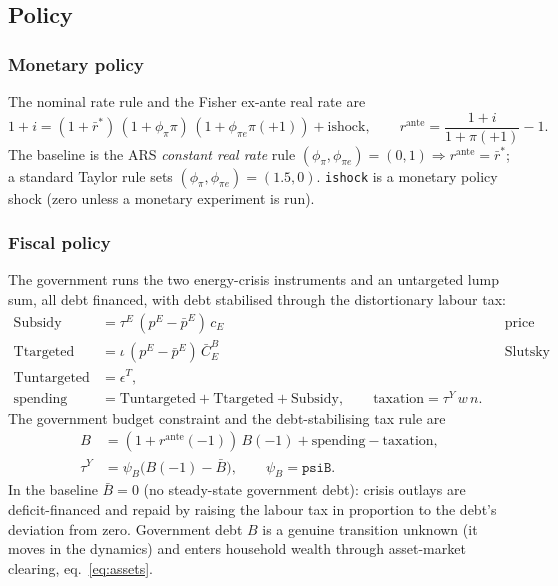 \documentclass[11pt,a4paper]{article}
\newcommand{\pE}{p^{E}}
\begin{document}
\subsection{Policy}\label{sec:policy}

\subsubsection{Monetary policy}

The nominal rate rule and the Fisher ex-ante real rate are
\begin{equation}
1+i = (1+\bar r^{*})\,(1+\phi_\pi\pi)\,(1+\phi_{\pi e}\pi(+1))+\text{ishock},
\qquad
r^{\text{ante}} = \frac{1+i}{1+\pi(+1)}-1.
\end{equation}
The baseline is the ARS \emph{constant real rate} rule
$(\phi_\pi,\phi_{\pi e})=(0,1)\Rightarrow r^{\text{ante}}=\bar r^{*}$; a standard
Taylor rule sets $(\phi_\pi,\phi_{\pi e})=(1.5,0)$. \texttt{ishock} is a monetary
policy shock (zero unless a monetary experiment is run).

\subsubsection{Fiscal policy}\label{sec:fiscal}

The government runs the two energy-crisis instruments and an untargeted lump sum,
all debt financed, with debt stabilised through the distortionary labour tax:
\begin{align}
\text{Subsidy} &= \tau^{E}\,(\pE-\bar\pE)\,c_E
&& \text{price cap (cost scales with actual use),}\\
\text{Ttargeted} &= \iota\,(\pE-\bar\pE)\,\bar C^{B}_{E}
&& \text{Slutsky transfer (cost scales with pre-crisis brown use),}\\
\text{Tuntargeted} &= \epsilon^{T}, &&\\[2pt]
\text{spending} &= \text{Tuntargeted}+\text{Ttargeted}+\text{Subsidy},\qquad
\text{taxation}=\tau^{Y}\,w\,n. &&
\end{align}
The government budget constraint and the debt-stabilising tax rule are
\begin{align}
B &= (1+r^{\text{ante}}(-1))\,B(-1)+\text{spending}-\text{taxation},
\label{eq:gbc}\\
\tau^{Y} &= \psi_B\bigl(B(-1)-\bar B\bigr),\qquad \psi_B=\texttt{psiB}.
\label{eq:taurule}
\end{align}
In the baseline $\bar B=0$ (no steady-state government debt): crisis outlays are
deficit-financed and repaid by raising the labour tax in proportion to the debt's
deviation from zero. Government debt $B$ is a genuine transition unknown (it moves
in the dynamics) and enters household wealth through asset-market clearing,
eq.~\eqref{eq:assets}.
\end{document}
